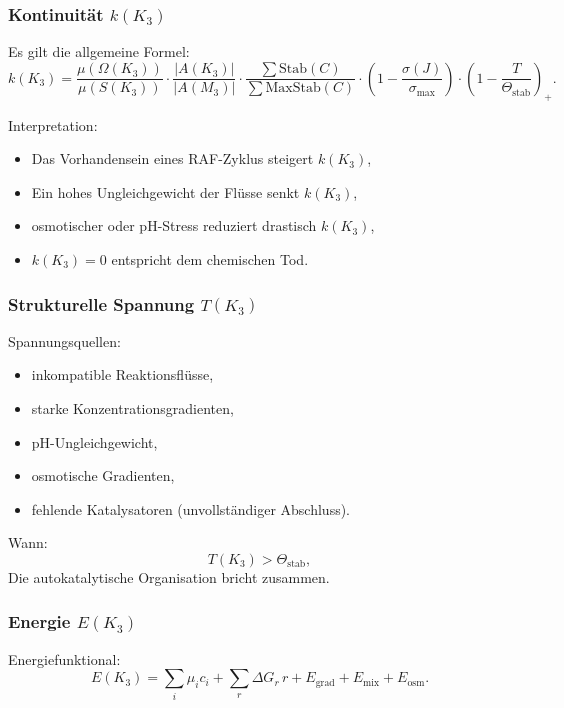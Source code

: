 \subsubsection{Kontinuität \texorpdfstring{$k(K_3)$}{k(K_3)}}

Es gilt die allgemeine Formel:
\[
k(K_3) =
\frac{\mu(\Omega(K_3))}{\mu(S(K_3))}
\cdot
\frac{|A(K_3)|}{|A(M_3)|}
\cdot
\frac{\sum \mathrm{Stab}(C)}{\sum \mathrm{MaxStab}(C)}
\cdot
(1 - \frac{\sigma(J)}{\sigma_{\max}})
\cdot
(1 - \frac{T}{\Theta_{\mathrm{stab}}})_+.
\]

Interpretation:
\begin{itemize}
    \item Das Vorhandensein eines RAF-Zyklus steigert $k(K_3)$,
    \item Ein hohes Ungleichgewicht der Flüsse senkt $k(K_3)$,
    \item osmotischer oder pH-Stress reduziert drastisch $k(K_3)$,
    \item $k(K_3)=0$ entspricht dem chemischen Tod.
\end{itemize}

\subsubsection{Strukturelle Spannung \texorpdfstring{$T(K_3)$}{T(K_3)}}

Spannungsquellen:
\begin{itemize}
    \item inkompatible Reaktionsflüsse,
    \item starke Konzentrationsgradienten,
    \item pH-Ungleichgewicht,
    \item osmotische Gradienten,
    \item fehlende Katalysatoren (unvollständiger Abschluss).
\end{itemize}

Wann:
\[
T(K_3) > \Theta_{\mathrm{stab}},
\]
Die autokatalytische Organisation bricht zusammen.

\subsubsection{Energie \texorpdfstring{$E(K_3)$}{E(K_3)}}

Energiefunktional:
\[
E(K_3) =
\sum_i \mu_i c_i +
\sum_r \Delta G_r\, r +
E_{\mathrm{grad}} + E_{\mathrm{mix}} + E_{\mathrm{osm}}.
\]

